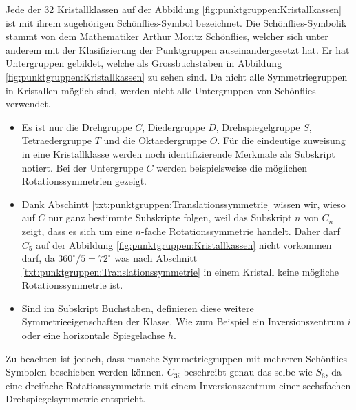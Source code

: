 Jede der 32 Kristallklassen auf der Abbildung \ref{fig:punktgruppen:Kristallkassen} ist mit ihrem zugehörigen Schönflies-Symbol bezeichnet.
 Die Schönflies-Symbolik stammt von dem Mathematiker Arthur Moritz Schönflies, welcher sich unter anderem mit der Klasifizierung der Punktgruppen auseinandergesetzt hat.
 Er hat Untergruppen gebildet, welche als Grossbuchstaben in Abbildung \ref{fig:punktgruppen:Kristallkassen} zu sehen sind.
 Da nicht alle Symmetriegruppen in Kristallen möglich sind, werden nicht alle Untergruppen von Schönflies verwendet.
 \begin{itemize}
   \item Es ist nur die Drehgruppe \(C\), Diedergruppe \(D\), Drehspiegelgruppe \(S\), Tetraedergruppe \(T\) und die Oktaedergruppe \(O\).
     Für die eindeutige zuweisung in eine Kristallklasse werden noch identifizierende Merkmale als Subskript notiert.
     Bei der Untergruppe \(C\) werden beispielsweise die möglichen Rotationssymmetrien gezeigt.
   \item Dank Abschintt \ref{txt:punktgruppen:Translationssymmetrie} wissen wir, wieso auf \(C\) nur ganz bestimmte Subskripte folgen, weil das Subskript \(n\) von \(C_n\) zeigt, dass es sich um eine \(n\)-fache Rotationssymmetrie handelt.
     Daher darf \(C_5\) auf der Abbildung \ref{fig:punktgruppen:Kristallkassen} nicht vorkommen darf, da \(360^\circ/5 =  72^\circ\) was nach Abschnitt \ref{txt:punktgruppen:Translationssymmetrie} in einem Kristall keine mögliche Rotationssymmetrie ist.
   \item Sind im Subskript Buchstaben, definieren diese weitere Symmetrieeigenschaften der Klasse.
     Wie zum Beispiel ein Inversionszentrum \(i\) oder eine horizontale Spiegelachse \(h\).
 \end{itemize}
Zu beachten ist jedoch, dass manche Symmetriegruppen mit mehreren Schönflies-Symbolen beschieben werden können.
 \(C_{3i}\) beschreibt genau das selbe wie \(S_6\), da eine dreifache Rotationssymmetrie mit einem Inversionszentrum einer sechsfachen Drehspiegelsymmetrie entspricht.




